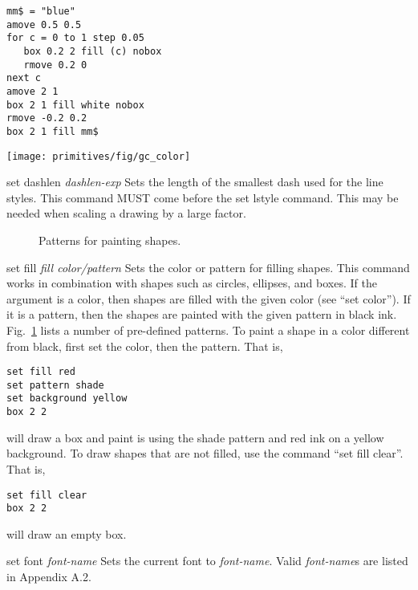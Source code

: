\begin{commanddescription}
\vspace{0.25cm}
\begin{minipage}[c]{8cm}
\begin{Verbatim}
mm$ = "blue"
amove 0.5 0.5 
for c = 0 to 1 step 0.05
   box 0.2 2 fill (c) nobox
   rmove 0.2 0
next c 
amove 2 1 
box 2 1 fill white nobox
rmove -0.2 0.2
box 2 1 fill mm$
\end{Verbatim}
\end{minipage}
\hfill
\begin{minipage}[c]{7cm}
\mbox{\texttt{[image: primitives/fig/gc\_color]}}
\end{minipage}

\item[{\sf set dashlen {\it dashlen-exp}}]
Sets the length of the smallest dash used for the line styles.
This command MUST come before the {\sf set lstyle} command.
This may be needed when scaling a drawing by a large factor.

\begin{figure}
\centering
\mbox{}
\caption{\label{filpat:fig}Patterns for painting shapes.}
\end{figure}

\item[{\sf set fill {\it fill color/pattern}}]
Sets the color or pattern for filling shapes. This command works in combination with shapes such as circles, ellipses, and boxes. If the argument is a color, then shapes are filled with the given color (see ``set color''). If it is a pattern, then the shapes are painted with the given pattern in black ink. Fig.~\ref{filpat:fig} lists a number of pre-defined patterns. To paint a shape in a color different from black, first set the color, then the pattern. That is,

\begin{Verbatim}
set fill red
set pattern shade
set background yellow
box 2 2
\end{Verbatim}

\noindent{}will draw a box and paint is using the shade pattern and red ink on a yellow background. To draw shapes that are not filled, use the command ``set fill clear''. That is,

\begin{Verbatim}
set fill clear
box 2 2
\end{Verbatim}

\noindent{}will draw an empty box.

\item[{\sf set font {\it font-name}}]
Sets the current font to {\it font-name}.  Valid {\it font-name}s are listed
in Appendix A.2.


\end{commanddescription}
